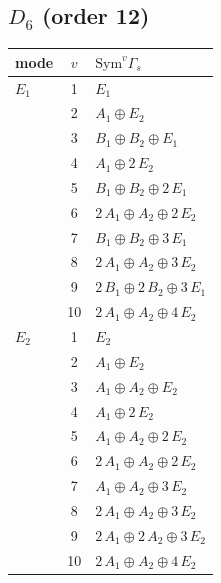 \documentclass[11pt]{article}
\begin{document}
\subsection*{$D_{6}$ \quad (order 12)}
\begin{longtable}{l c p{}}
\hline mode & $v$ & $\mathrm{Sym}^v\Gamma_s$\\ \hline\endhead
$E_{1}$ & 1 & $E_{1}$\\
 & 2 & $A_{1}\oplus E_{2}$\\
 & 3 & $B_{1}\oplus B_{2}\oplus E_{1}$\\
 & 4 & $A_{1}\oplus 2\,E_{2}$\\
 & 5 & $B_{1}\oplus B_{2}\oplus 2\,E_{1}$\\
 & 6 & $2\,A_{1}\oplus A_{2}\oplus 2\,E_{2}$\\
 & 7 & $B_{1}\oplus B_{2}\oplus 3\,E_{1}$\\
 & 8 & $2\,A_{1}\oplus A_{2}\oplus 3\,E_{2}$\\
 & 9 & $2\,B_{1}\oplus 2\,B_{2}\oplus 3\,E_{1}$\\
 & 10 & $2\,A_{1}\oplus A_{2}\oplus 4\,E_{2}$\\
\hline
$E_{2}$ & 1 & $E_{2}$\\
 & 2 & $A_{1}\oplus E_{2}$\\
 & 3 & $A_{1}\oplus A_{2}\oplus E_{2}$\\
 & 4 & $A_{1}\oplus 2\,E_{2}$\\
 & 5 & $A_{1}\oplus A_{2}\oplus 2\,E_{2}$\\
 & 6 & $2\,A_{1}\oplus A_{2}\oplus 2\,E_{2}$\\
 & 7 & $A_{1}\oplus A_{2}\oplus 3\,E_{2}$\\
 & 8 & $2\,A_{1}\oplus A_{2}\oplus 3\,E_{2}$\\
 & 9 & $2\,A_{1}\oplus 2\,A_{2}\oplus 3\,E_{2}$\\
 & 10 & $2\,A_{1}\oplus A_{2}\oplus 4\,E_{2}$\\
\hline
\end{longtable}
\end{document}
